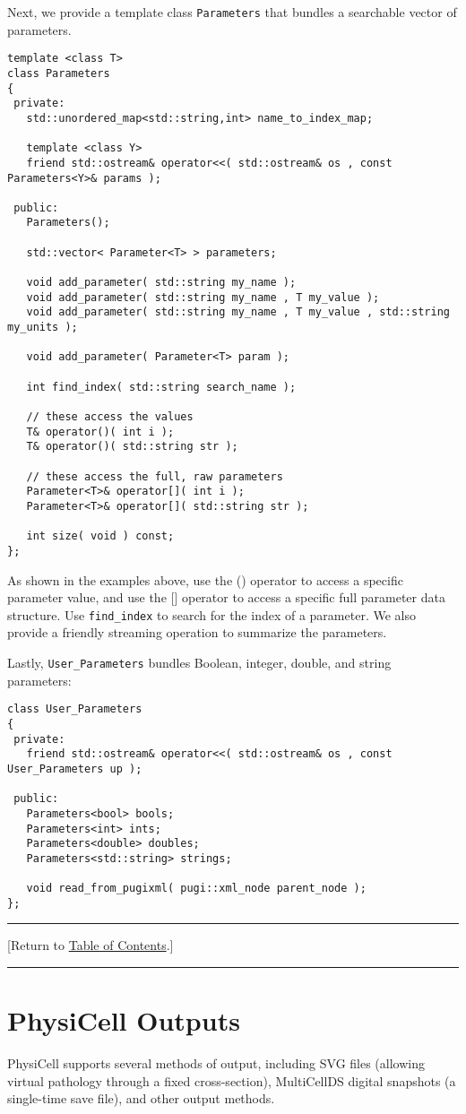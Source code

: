 \documentclass[12pt]{article}
\renewcommand{\v}{\verb}
\newcommand{\blue}[1]{\textcolor{blue}{#1}}
\newcommand{\DONE}{}%
\newcommand{\TOClink}{\begin{center}\hrule\vskip-10pt\phantom{.}\hfill[Return to \hyperlink{TOC}{Table of Contents}.]\hfill\phantom{.}\vskip3pt\hrule\end{center}}
\begin{document}
Next, we provide a template class \v|Parameters| that bundles a searchable vector of parameters. 
\begin{verbatim}
template <class T>
class Parameters
{
 private:
   std::unordered_map<std::string,int> name_to_index_map; 
   
   template <class Y>
   friend std::ostream& operator<<( std::ostream& os , const Parameters<Y>& params ); 

 public: 
   Parameters(); 
 
   std::vector< Parameter<T> > parameters; 
   
   void add_parameter( std::string my_name ); 
   void add_parameter( std::string my_name , T my_value ); 
   void add_parameter( std::string my_name , T my_value , std::string my_units ); 
   
   void add_parameter( Parameter<T> param );
   
   int find_index( std::string search_name ); 
   
   // these access the values 
   T& operator()( int i );
   T& operator()( std::string str ); 

   // these access the full, raw parameters 
   Parameter<T>& operator[]( int i );
   Parameter<T>& operator[]( std::string str ); 
   
   int size( void ) const; 
};
\end{verbatim} 
As shown in the examples above, use the () operator to access a specific parameter value, and use the [] operator to access a specific full parameter data structure. Use \v|find_index| to search for the index of a parameter. We also provide a friendly streaming operation to summarize the parameters. 

Lastly, \v|User_Parameters| bundles Boolean, integer, double, and string parameters: 
\begin{verbatim}
class User_Parameters
{
 private:
   friend std::ostream& operator<<( std::ostream& os , const User_Parameters up ); 
 
 public:
   Parameters<bool> bools; 
   Parameters<int> ints; 
   Parameters<double> doubles; 
   Parameters<std::string> strings; 
   
   void read_from_pugixml( pugi::xml_node parent_node );
}; 
\end{verbatim}

\TOClink 

\section{PhysiCell Outputs \DONE}
\label{sec:Outputs}
PhysiCell supports several methods of output, including 
SVG files (allowing virtual pathology through a fixed cross-section), 
MultiCellDS digital snapshots (a single-time save file), 
and other output methods. 
\end{document}
